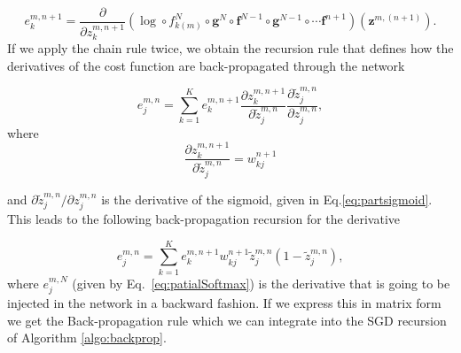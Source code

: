 \begin{equation}
e^{m,n+1}_k = \frac{\partial}{\partial z^{m,n+1}_{k}} (\log \circ f_{k(m)}^N \circ \mathbf{g}^N \circ \mathbf{f}^{N-1} \circ \mathbf{g}^{N-1} \circ \cdots \mathbf{f}^{n+1})(\mathbf{z}^{m,(n+1)}).
\end{equation}
%
%
\noindent If we apply the chain rule twice, we obtain the
recursion rule that defines how the derivatives of the cost function are back-propagated through the network\footnotemark{}

\begin{equation}
e^{m,n}_j = \sum_{k=1}^K e^{m,n+1}_k \frac{\partial z^{m,n+1}_k}{\partial \tilde{z}_{j}^{m,n}}\frac{\partial \tilde{z}^{m,n}_{j}}{\partial z_{j}^{m,n}},
\label{eq:chainRulRecursion}
\end{equation}
%
where %
\begin{equation}
\frac{\partial z^{m,n+1}_k}{\partial \tilde{z}_{j}^{m,n}} = w_{kj}^{n+1} 
\end{equation}

\noindent and ${\partial \tilde{z}^{m,n}_{j}}/{\partial z_{j}^{m,n}}$ is the derivative of the sigmoid, given in Eq.\ref{eq:partsigmoid}. This leads to the following back-propagation recursion for the derivative

\begin{equation}
e^{m,n}_j = \sum_{k=1}^K e^{m,n+1}_k w_{kj}^{n+1}\tilde{z}^{m,n}_{j}(1-\tilde{z}^{m,n}_{j}),
\end{equation}
%
\noindent where $e^{m,N}_j$ (given by Eq.~\ref{eq:patialSoftmax}) is the derivative that is going to be injected in the network in a backward fashion. 
If we express this in matrix form we get the Back-propagation rule which we can integrate into the SGD recursion of Algorithm \ref{algo:backprop}. 

